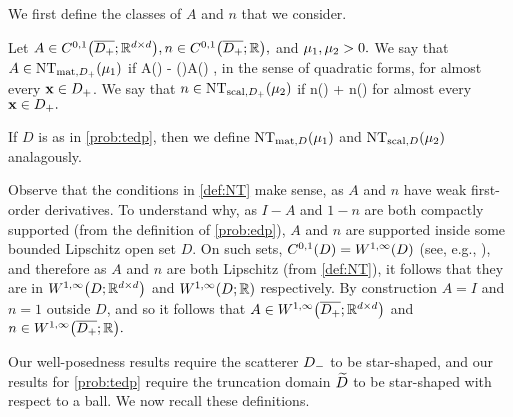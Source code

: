   We first define the classes of $A$ and $n$ that we consider.%

  
\label{def:NT}
Let $A \in \CzoDpclosRRdtd, n \in \CzoDpclosRR,$ and $\mu_{1}, \mu_{2} > 0.$ We say that $A \in \NTADp{\muo}$ if
\beqs
A(\bx) - \mleft(\bx \cdot \grad\mright)A(\bx) \geq \muo,
\eeqs
in the sense of quadratic forms, for almost every $\mathbf{x} \in D_{+}$. We say that $n \in \NTnDp{\mut}$ if
\beqs
n(\bx) + \bx \cdot \grad n(\bx) \geq \mut
\eeqs
for almost every $\mathbf{x} \in D_{+}.$

If $D$ is as in \cref{prob:tedp}, then we define $\NTAD{\muo}$ and $\NTnD{\mut}$ analagously.
\ede

Observe that the conditions in \cref{def:NT} make sense, as $A$ and $n$ have weak first-order derivatives. To understand why, as $I-A$ and $1-n$ are both compactly supported (from the definition of \cref{prob:edp}), $A$ and $n$ are supported inside some bounded Lipschitz open set $D$. On such sets, $\CzoD = \WoiD$ (see, e.g., \cite[Section 4.2.3, Theorem 5]{EvGa:92}), and therefore as $A$ and $n$ are both Lipschitz (from \cref{def:NT}), it follows that they are in $\WoiDRRdtd$ and $\WoiDRR$ respectively. By construction $A=I$ and $n=1$ outside $D$, and so it follows that $A \in \WoiDpclosRRdtd$ and $n \in \WoiDpclosRR.$
\ere

Our well-posedness results  require the scatterer $D_{-}$ to be star-shaped, and our results for \cref{prob:tedp}  require the truncation domain $\widetilde{D}$ to be star-shaped with respect to a ball. We now recall these definitions.

